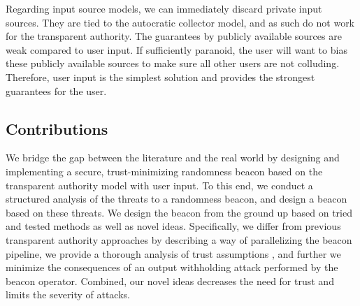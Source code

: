 Regarding input source models, we can immediately discard private input sources. They are tied to the autocratic collector model, and as such do not work for the transparent authority. The guarantees by publicly available sources are weak compared to user input. If sufficiently paranoid, the user will want to bias these publicly available sources to make sure all other users are not colluding. Therefore, user input is the simplest solution and provides the strongest guarantees for the user.

\subsection{Contributions}
We bridge the gap between the literature and the real world by designing and implementing a secure, trust-minimizing randomness beacon based on the transparent authority model with user input. To this end, we conduct a structured analysis of the threats to a randomness beacon, and design a beacon based on these threats. We design the beacon from the ground up based on tried and tested methods as well as novel ideas. Specifically, we differ from previous transparent authority approaches by describing a way of parallelizing the beacon pipeline, we provide a thorough analysis of trust assumptions , and further we minimize the consequences of an output withholding attack performed by the beacon operator. Combined, our novel ideas decreases the need for trust and limits the severity of attacks.

